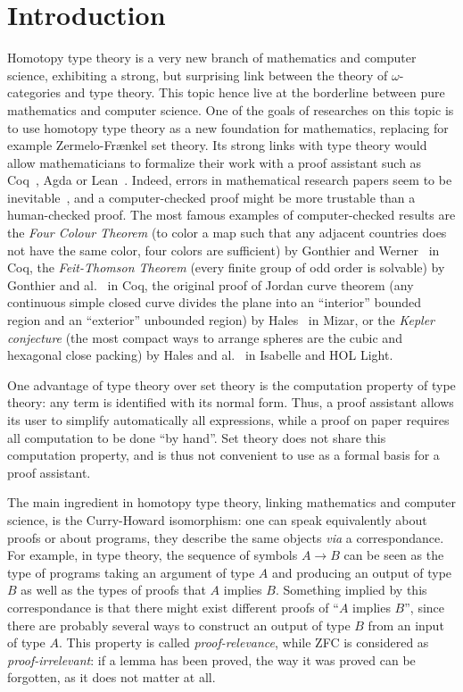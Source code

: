 \chapter{Introduction}
\label{chap:intro}

Homotopy type theory is a very new branch of mathematics and computer
science, exhibiting a strong, but surprising link between the theory
of $\omega$-categories and type theory. This topic hence live at the
borderline between pure mathematics and computer science. One of the
goals of researches on this topic is to use homotopy type theory as a
new foundation for mathematics, replacing for example Zermelo-Frænkel
set theory. Its strong links with type theory would allow
mathematicians to formalize their work with a proof assistant such as
Coq~\cite{coq:refman:8.4}, Agda\cite{norell2007towards} or
Lean~\cite{lean}. Indeed, errors in mathematical research papers seem
to be inevitable~\cite{vv-univ-f}, and a computer-checked proof might
be more trustable than a human-checked proof.
The most famous examples of computer-checked results are the {\em Four
  Colour Theorem} (to color a map such that any adjacent countries
does not have the same color, four colors are sufficient) by Gonthier
and Werner~\cite{gonthier-four-color} in Coq, the {\em Feit-Thomson
  Theorem} (every finite group of odd order is solvable) by Gonthier
and al.~\cite{gonthier-feit} in Coq, the original proof of Jordan curve
theorem (any continuous simple closed curve divides the plane into an
``interior'' bounded region and an ``exterior'' unbounded region) by
Hales~\cite{hales-jordan} in Mizar, or the {\em Kepler conjecture}
(the most compact ways to arrange spheres are the cubic and hexagonal close
packing) by Hales and al.~\cite{hales-kepler} in Isabelle and HOL Light.

One advantage of type theory over set theory is the computation
property of type theory: any term is identified with its normal
form. Thus, a proof assistant allows its user to simplify
automatically all expressions, while a proof on paper requires all
computation to be done ``by hand''. Set theory does not share this
computation property, and is thus not convenient to use as a formal
basis for a proof assistant.

The main ingredient in homotopy type theory, linking mathematics and
computer science, is the Curry-Howard isomorphism: one can speak
equivalently about proofs or about programs, they describe the same
objects {\em via} a correspondance. For example, in type theory, the
sequence of symbols $A\to B$ can be seen as the type of programs
taking an argument of type $A$ and producing an output of type $B$ as
well as the types of proofs that $A$ implies $B$. Something implied by
this correspondance is that there might exist different proofs of
``$A$ implies $B$'', since there are probably several ways to
construct an output of type $B$ from an input of type $A$. This
property is called {\em proof-relevance}, while ZFC is considered as
{\em proof-irrelevant}: if a lemma has been proved, the way it was
proved can be forgotten, as it does not matter at all.

